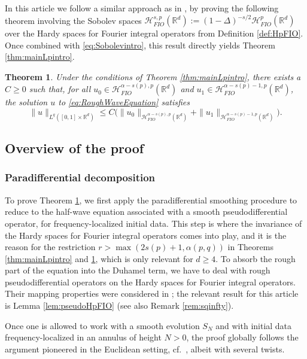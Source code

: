 \documentclass{amsart}
\numberwithin{equation}{section}
\newtheorem{theorem}{Theorem}[section]
\theoremstyle{definition}
\newcommand{\R}{\mathbb{R}}
\newcommand{\Rd}{\mathbb{R}^{d}}
\newcommand {\HT}{\mathcal{H}}
\newcommand {\Hp}{\mathcal{H}^{p}_{FIO}(\R^d)}
\begin{document}
In this article we follow a similar approach as in \cite{HassellRozendaal2023,LiRoSo25a}, by proving the following theorem involving the Sobolev spaces $\HT^{s,p}_{FIO}(\Rd):=(1-\Delta)^{-s/2}\Hp$ over the Hardy spaces for Fourier integral operators from Definition \ref{def:HpFIO}. Once combined with \eqref{eq:Sobolevintro}, this result directly yields Theorem \ref{thm:mainLpintro}.

\begin{theorem}\label{thm:mainHpFIOintro}
Under the conditions of Theorem \ref{thm:mainLpintro}, there exists a $C\geq0$ such that, for all $u_{0}\in \HT^{\alpha-s(p),p}_{FIO}(\R^d)$ and $u_{1}\in \HT^{\alpha-s(p)-1,p}_{FIO}(\R^d)$, the solution $u$ to \eqref{eq:RoughWaveEquation} satisfies %
\[
\|u\|_{L^{q}([0,1]\times \R^d)}\leq C\big(\|u_{0}\|_{\HT^{\alpha-s(p),p}_{FIO}(\R^d)}+\|u_{1}\|_{\HT^{\alpha-s(p)-1,p}_{FIO}(\R^d)}).
\]
\end{theorem}

\subsection{Overview of the proof}\label{subsec:proof}
\subsubsection{Paradifferential decomposition}
To prove Theorem \ref{thm:mainHpFIOintro}, we first apply the paradifferential smoothing procedure to reduce to the half-wave equation associated with a smooth pseudodifferential operator, for frequency-localized initial data. This step is where the invariance of the Hardy spaces for Fourier integral operators comes into play, and it is the reason for the restriction $r>\max(2s(p)+1,\alpha(p,q))$ in Theorems \ref{thm:mainLpintro} and \ref{thm:mainHpFIOintro}, which is only relevant for $d\geq 4$.
To absorb the rough part of the equation into the Duhamel term, we have to deal with rough pseudodifferential operators on the Hardy spaces for Fourier integral operators. Their mapping properties were considered in \cite{Rozendaal23a,Rozendaal22,LiRoSo25a}; the relevant result for this article is Lemma \ref{lem:pseudoHpFIO} (see also Remark \ref{rem:sqinfty}).

Once one is allowed to work with a smooth evolution $S_{N}$ 
and with initial data frequency-localized in an annulus of height $N>0$, the proof globally follows the argument pioneered in 
the Euclidean setting, cf.~\cite{TaoVargas2000}, albeit with several twists. 
\end{document}
